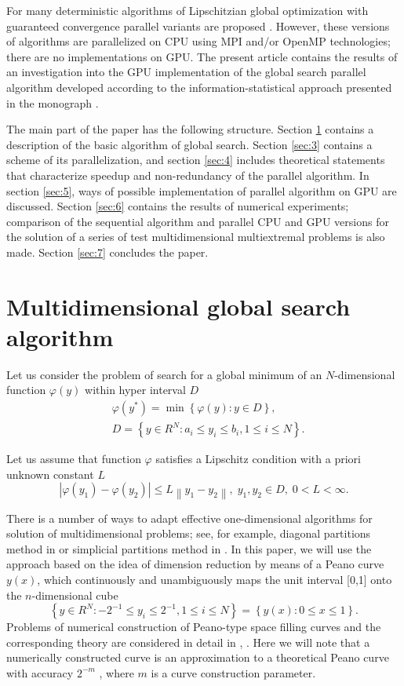 \documentclass[smallcondensed]{svjour3}     %
\begin{document}
For many deterministic algorithms of Lipschitzian global optimization with guaranteed convergence parallel variants are proposed \cite{RefGergel2005,RefEvtushenko,RefHe,RefPaulavicius}. However, these versions of algorithms are parallelized on CPU using MPI and/or OpenMP technologies; there are no implementations on GPU. The present article contains the results of an investigation into the GPU implementation of the global search parallel algorithm developed according to the information-statistical approach presented in the monograph \cite{RefStrongin2000}.

The main part of the paper has the following structure. Section \ref{sec:2} contains a description of the basic algorithm of global search. Section \ref{sec:3} contains a scheme of its parallelization, and section \ref{sec:4} includes theoretical statements that characterize speedup and non-redundancy of the parallel algorithm. In section \ref{sec:5}, ways of possible implementation of parallel algorithm on GPU are discussed. Section \ref{sec:6} contains the results of numerical experiments; comparison of the sequential algorithm and parallel CPU and GPU versions for the solution of a series of test multidimensional multiextremal problems is also made. Section \ref{sec:7} concludes the paper.

\section{Multidimensional global search algorithm} \label{sec:2}

Let us consider the problem of search for a global minimum of an $N$-dimensional function $\varphi(y)$ within hyper interval $D$
\begin{eqnarray}\label{eq:1}
& \varphi(y^\ast)=\min{\left\{\varphi(y):y\in D\right\}},\\
& D=\left\{y\in R^N: a_i\leq y_i \leq b_i, 1\leq i \leq N\right\}. \nonumber
\end{eqnarray}

Let us assume that function $\varphi$ satisfies a Lipschitz condition with a priori unknown constant $L$
\[
\left|\varphi(y_1)-\varphi(y_2)\right|\leq L\left\|y_1-y_2\right\|,\; y_1,y_2 \in D,\; 0<L<\infty.
\]

There is a number of ways to adapt effective one-dimensional algorithms for solution of multidimensional problems; see, for example, diagonal partitions method in \cite{RefSergeyev2006} or simplicial partitions method in \cite{RefZilinskas}. In this paper, we will use the approach based on the idea of dimension reduction by means of a Peano curve $y(x)$, which continuously and unambiguously maps the unit interval [0,1] onto the $n$-dimensional cube
\[
\left\{y\in R^N: -2^{-1}\leq y_i \leq 2^{-1}, 1 \leq i \leq N\right\}=\left\{y(x):0\leq x \leq 1 \right\}.
\]
Problems of numerical construction of Peano-type space filling curves and the corresponding theory are considered in detail in \cite{RefStrongin2000}, \cite{RefSergeyev2013}. Here we will note that a numerically constructed curve is an approximation to a theoretical Peano curve with accuracy $2^{-m}$ , where $m$ is a curve construction parameter.
\end{document}

